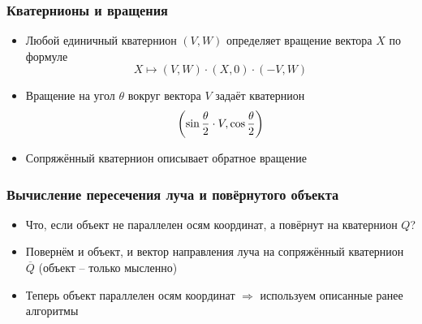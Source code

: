 \documentclass[10pt]{beamer}
\begin{document}
\begin{frame}
\frametitle{Кватернионы и вращения}
\begin{itemize}
\item Любой единичный кватернион \begin{math}(V,W)\end{math} определяет вращение вектора \begin{math}X\end{math} по формуле
\begin{equation}
X \mapsto (V, W) \cdot (X, 0) \cdot (-V, W)
\end{equation}
\pause
\item Вращение на угол \begin{math}\theta\end{math} вокруг вектора \begin{math}V\end{math} задаёт кватернион
\begin{equation}
\left(\sin{\theta\over 2} \cdot V, \cos{\theta\over 2}\right)
\end{equation}
\pause
\item Сопряжённый кватернион описывает обратное вращение
\end{itemize}
\end{frame}

\begin{frame}
\frametitle{Вычисление пересечения луча и повёрнутого объекта}
\begin{itemize}
\item Что, если объект не параллелен осям координат, а повёрнут на кватернион \begin{math}Q\end{math}?
\pause
\item Повернём и объект, и вектор направления луча на сопряжённый кватернион \begin{math}\overline{Q}\end{math} (объект -- только мысленно)
\pause
\item Теперь объект параллелен осям координат \begin{math}\Longrightarrow\end{math} используем описанные ранее алгоритмы
\end{itemize}
\end{frame}
\end{document}
